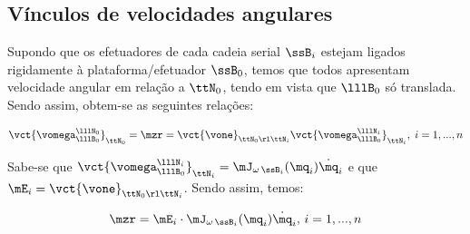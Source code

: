 \documentclass[]{politex}
\begin{document}
\subsection{Vínculos de velocidades angulares} \label{S05-03-02-03}

Supondo que os efetuadores de cada cadeia serial $\ssB_i$ estejam ligados rigidamente à plataforma/efetuador $\ssB_0$, temos que todos apresentam velocidade angular em relação a $\ttN_0$, tendo em vista que $\lllB_0$ só translada. Sendo assim, obtem-se as seguintes relações:

\begin{equation}
\vct{\vomega^{\lllN_0}_{\lllB_0}}_{\ttN_0} = \mzr = \vct{\vone}_{\ttN_0 \rl \ttN_i}  \vct{\vomega^{\lllN_i}_{\lllB_0}}_{\ttN_i} , \; i = 1, ... , n
\end{equation}

Sabe-se que $\vct{\vomega^{\lllN_i}_{\lllB_0}}_{\ttN_i} =  \mJ_{\omega\,\ssB_i}(\mq_i) \dot{\mq}_i$ e que $\mE_i =\vct{\vone}_{\ttN_0 \rl \ttN_i}$. Sendo assim, temos:

\begin{equation}
\mzr = \mE_i \cdot \mJ_{\omega\,\ssB_i}(\mq_i) \dot{\mq}_i, \, i = 1,...,n
\end{equation}
\end{document}
